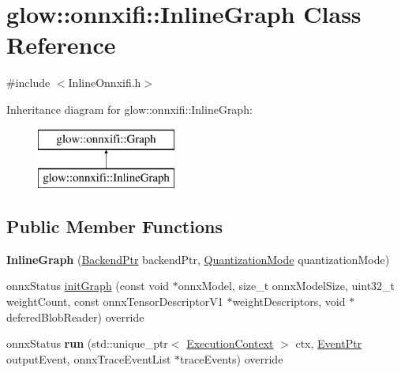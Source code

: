 \hypertarget{classglow_1_1onnxifi_1_1_inline_graph}{}\section{glow\+:\+:onnxifi\+:\+:Inline\+Graph Class Reference}
\label{classglow_1_1onnxifi_1_1_inline_graph}


{\ttfamily \#include $<$Inline\+Onnxifi.\+h$>$}

Inheritance diagram for glow\+:\+:onnxifi\+:\+:Inline\+Graph\+:\begin{figure}[H]
\begin{center}
\leavevmode
\includegraphics[height=2.000000cm]{classglow_1_1onnxifi_1_1_inline_graph}
\end{center}
\end{figure}
\subsection*{Public Member Functions}
\begin{DoxyCompactItemize}
\item 
\mbox{\label{classglow_1_1onnxifi_1_1_inline_graph_a1deea6f74b8858b0a42d6f31cc436cea}} 
{\bfseries Inline\+Graph} (\hyperlink{classglow_1_1onnxifi_1_1_backend}{Backend\+Ptr} backend\+Ptr, \hyperlink{structglow_1_1_precision_configuration_a9a40e5e2126e4c6f3e8fe3bab25ff12c}{Quantization\+Mode} quantization\+Mode)
\item 
onnx\+Status \hyperlink{classglow_1_1onnxifi_1_1_inline_graph_a989222c5a599a06aef3f7fc1c394f5eb}{init\+Graph} (const void $\ast$onnx\+Model, size\+\_\+t onnx\+Model\+Size, uint32\+\_\+t weight\+Count, const onnx\+Tensor\+Descriptor\+V1 $\ast$weight\+Descriptors, void $\ast$defered\+Blob\+Reader) override
\item 
\mbox{\label{classglow_1_1onnxifi_1_1_inline_graph_a391b569886a0403f765dc260641a51af}} 
onnx\+Status {\bfseries run} (std\+::unique\+\_\+ptr$<$ \hyperlink{classglow_1_1_execution_context}{Execution\+Context} $>$ ctx, \hyperlink{classglow_1_1onnxifi_1_1_event}{Event\+Ptr} output\+Event, onnx\+Trace\+Event\+List $\ast$trace\+Events) override
\end{DoxyCompactItemize}
